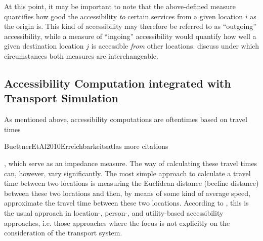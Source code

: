 At this point, it may be important to note that the above-defined measure quantifies how good the accessibility \textit{to} 
certain services from a given location $i$ as the origin is. This kind of accessibility may therefore be referred to 
as ``outgoing'' accessibility, while a measure of ``ingoing'' accessibility would quantify how well a given destination 
location $j$ is accessible \textit{from} other locations. \citet{NicolaiNagel2012HiResAccessibilityMethodInBook} 
discuss under which circumstances both measures are interchangeable.

\subsection{Accessibility Computation integrated with Transport Simulation}
As mentioned above, accessibility computations are oftentimes based on travel times 

BuettnerEtAl2010Erreichbarkeitsatlas
more citations

, which serve as an impedance 
measure. The way of calculating these travel times can, however, vary significantly. The most simple approach to calculate 
a travel time between two locations is measuring the Euclidean distance (beeline distance) between these two locations and then, 
by means of some kind of average speed, approximate the travel time between these two locations. According to 
\citet{Geurs2004AccessibilityReview}, this is the usual approach in location-, person-, and utility-based accessibility 
approaches, i.e. those approaches where the focus is not explicitly on the consideration of the transport system.



